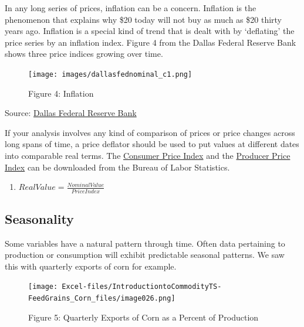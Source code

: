 \documentclass[
  letterpaper,
  DIV=11,
  numbers=noendperiod]{scrreprt}
\providecommand{\tightlist}{%
  \setlength{\itemsep}{0pt}\setlength{\parskip}{0pt}}\usepackage{longtable,booktabs,array}
\begin{document}
In any long series of prices, inflation can be a concern. Inflation is
the phenomenon that explains why \$20 today will not buy as much as \$20
thirty years ago. Inflation is a special kind of trend that is dealt
with by `deflating' the price series by an inflation index. Figure 4
from the Dallas Federal Reserve Bank shows three price indices growing
over time.

\begin{figure}

{\centering \texttt{[image: images/dallasfednominal\_c1.png]}

}

\caption{Figure 4: Inflation}

\end{figure}

Source:
\href{http://www.dallasfed.org/research/basics/nominal.cfm}{Dallas
Federal Reserve Bank}

If your analysis involves any kind of comparison of prices or price
changes across long spans of time, a price deflator should be used to
put values at different dates into comparable real terms. The
\href{http://www.bls.gov/cpi/data.htm}{Consumer Price Index} and the
\href{http://www.bls.gov/ppi/data.htm}{Producer Price Index} can be
downloaded from the Bureau of Labor Statistics.

\begin{enumerate}
\def\labelenumi{(\arabic{enumi})}
\setcounter{enumi}{1}
\tightlist
\item
  \(Real Value = \frac{Nominal Value}{Price Index}\)
\end{enumerate}

\hypertarget{seasonality}{%
\subsection{Seasonality}\label{seasonality}}

Some variables have a natural pattern through time. Often data
pertaining to production or consumption will exhibit predictable
seasonal patterns. We saw this with quarterly exports of corn for
example.

\begin{figure}

{\centering \texttt{[image: Excel-files/IntroductiontoCommodityTS-FeedGrains\_Corn\_files/image026.png]}

}

\caption{Figure 5: Quarterly Exports of Corn as a Percent of Production}

\end{figure}
\end{document}
